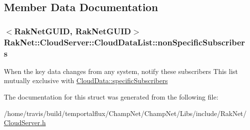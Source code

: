 \subsection{Member Data Documentation}
\hypertarget{struct_rak_net_1_1_cloud_server_1_1_cloud_data_list_a04e1a204973c5df1d56d17f5d99f36ea}{
\subsubsection[{non\-Specific\-Subscribers}]{$<${\bf Rak\-Net\-G\-U\-I\-D}, {\bf Rak\-Net\-G\-U\-I\-D}$>$ Rak\-Net\-::\-Cloud\-Server\-::\-Cloud\-Data\-List\-::non\-Specific\-Subscribers}}\label{struct_rak_net_1_1_cloud_server_1_1_cloud_data_list_a04e1a204973c5df1d56d17f5d99f36ea}
When the key data changes from any system, notify these subscribers This list mutually exclusive with \hyperlink{struct_rak_net_1_1_cloud_server_1_1_cloud_data_a20639e17af5333fa9a88f2e887a0537b}{Cloud\-Data\-::specific\-Subscribers} 

The documentation for this struct was generated from the following file\-:\begin{DoxyCompactItemize}
\item 
/home/travis/build/temportalflux/\-Champ\-Net/\-Champ\-Net/\-Libs/include/\-Rak\-Net/\hyperlink{_cloud_server_8h}{Cloud\-Server.\-h}\end{DoxyCompactItemize}
